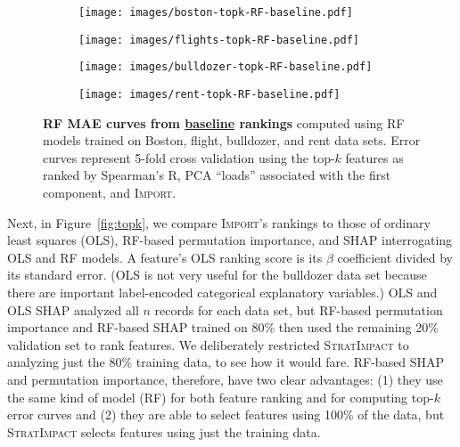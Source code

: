 \documentclass[smallextended]{svjour3}       %
\newcommand{\figref}[1]{Figure~\ref{#1}}
\newcommand{\Impo}{\fontfamily{cmr}\textsc{Import}}
\newcommand{\simp}{\fontfamily{cmr}\textsc{\small StratImpact}}
\begin{document}
\begin{figure}
\centering
\begin{subfigure}{.245\textwidth}
    \centering
\texttt{[image: images/boston-topk-RF-baseline.pdf]}
\vspace{-2mm}
\subcaption{}
\end{subfigure}%
\begin{subfigure}{.245\textwidth}
    \centering
\texttt{[image: images/flights-topk-RF-baseline.pdf]}
\vspace{-2mm}
\subcaption{}
\end{subfigure}
\begin{subfigure}{.245\textwidth}
    \centering
\texttt{[image: images/bulldozer-topk-RF-baseline.pdf]}
\vspace{-2mm}
\subcaption{}
\end{subfigure}
\begin{subfigure}{.245\textwidth}
    \centering
\texttt{[image: images/rent-topk-RF-baseline.pdf]}
\vspace{-2mm}
\subcaption{}
\end{subfigure} 
\vspace{-3mm}
\caption{\small {\bf RF MAE curves from \underline{baseline} rankings} computed using RF models trained on Boston, flight, bulldozer, and rent data sets. Error curves represent 5-fold cross validation using the top-$k$ features as ranked by Spearman's R, PCA ``loads'' associated with the first component, and \Impo{}.}
\label{fig:baseline}
\end{figure}

Next, in \figref{fig:topk}, we compare \Impo{}'s rankings to those of ordinary least squares (OLS), RF-based permutation importance, and SHAP interrogating OLS and RF models. A feature's OLS ranking score is its $\beta$ coefficient divided by its standard error. (OLS is not very useful for the bulldozer data set because there are important label-encoded categorical explanatory variables.) OLS and OLS SHAP analyzed all $n$ records for each data set, but RF-based permutation importance and RF-based SHAP trained on 80\% then used the remaining 20\% validation set to rank features. We deliberately restricted \simp{} to analyzing just the 80\% training data, to see how it would fare. RF-based SHAP and permutation importance, therefore, have two clear advantages: (1) they use the same kind of model (RF) for both feature ranking and for computing top-$k$ error curves and (2) they are able to select features using 100\% of the data, but \simp{} selects features using just the  training data.
\end{document}
